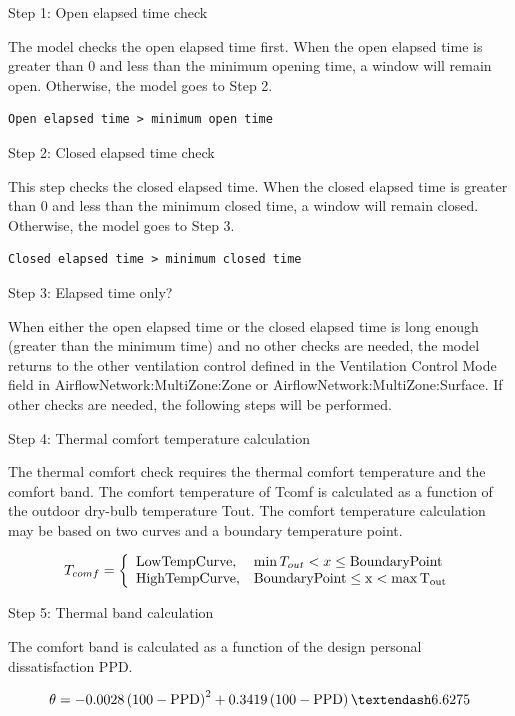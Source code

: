 Step 1: Open elapsed time check

The model checks the open elapsed time first. When the open elapsed time is greater than 0 and less than the minimum opening time, a window will remain open. Otherwise, the model goes to Step 2.

\begin{lstlisting}
Open elapsed time > minimum open time
\end{lstlisting}

Step 2: Closed elapsed time check

This step checks the closed elapsed time. When the closed elapsed time is greater than 0 and less than the minimum closed time, a window will remain closed. Otherwise, the model goes to Step 3.

\begin{lstlisting}
Closed elapsed time > minimum closed time
\end{lstlisting}

Step 3: Elapsed time only?

When either the open elapsed time or the closed elapsed time is long enough (greater than the minimum time) and no other checks are needed, the model returns to the other ventilation control defined in the Ventilation Control Mode field in AirflowNetwork:MultiZone:Zone or AirflowNetwork:MultiZone:Surface. If other checks are needed, the following steps will be performed.

Step 4: Thermal comfort temperature calculation

The thermal comfort check requires the thermal comfort temperature and the comfort band. The comfort temperature of Tcomf is calculated as a function of the outdoor dry-bulb temperature Tout. The comfort temperature calculation may be based on two curves and a boundary temperature point.

\begin{equation}
T_{comf} = \left\{ \begin{array}{ll} \rm{Low Temp Curve,} & \min T_{out} < x \leq \rm{Boundary Point} \\ \rm{High Temp Curve,} & \rm{Boundary Point} \leq x < \max T_{out}  \end{array}\right.
\end{equation}

Step 5: Thermal band calculation

The comfort band is calculated as a function of the design personal dissatisfaction PPD.

\begin{equation}
\theta = -0.0028 \left(100-\rm{PPD}\right)^2 + 0.3419 \left(100-\rm{PPD}\right) – 6.6275
\end{equation}

